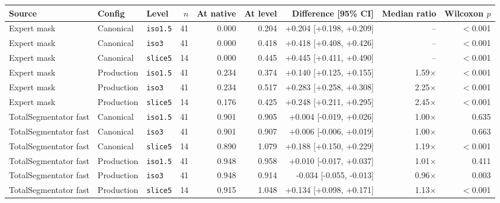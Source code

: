 \begin{tabular}{lllrrrrrr}
\toprule
Source & Config & Level & $n$ & At native & At level & Difference [95\% CI] & Median ratio & Wilcoxon $p$ \\
\midrule
Expert mask & Canonical & \texttt{iso1.5} & 41 & 0.000 & 0.204 & +0.204 [+0.198, +0.209] & -- & $<$0.001 \\
Expert mask & Canonical & \texttt{iso3} & 41 & 0.000 & 0.418 & +0.418 [+0.408, +0.426] & -- & $<$0.001 \\
Expert mask & Canonical & \texttt{slice5} & 14 & 0.000 & 0.445 & +0.445 [+0.411, +0.490] & -- & $<$0.001 \\
Expert mask & Production & \texttt{iso1.5} & 41 & 0.234 & 0.374 & +0.140 [+0.125, +0.155] & 1.59$\times$ & $<$0.001 \\
Expert mask & Production & \texttt{iso3} & 41 & 0.234 & 0.517 & +0.283 [+0.258, +0.308] & 2.25$\times$ & $<$0.001 \\
Expert mask & Production & \texttt{slice5} & 14 & 0.176 & 0.425 & +0.248 [+0.211, +0.295] & 2.45$\times$ & $<$0.001 \\
\midrule
TotalSegmentator fast & Canonical & \texttt{iso1.5} & 41 & 0.901 & 0.905 & +0.004 [-0.019, +0.026] & 1.00$\times$ & 0.635 \\
TotalSegmentator fast & Canonical & \texttt{iso3} & 41 & 0.901 & 0.907 & +0.006 [-0.006, +0.019] & 1.00$\times$ & 0.663 \\
TotalSegmentator fast & Canonical & \texttt{slice5} & 14 & 0.890 & 1.079 & +0.188 [+0.150, +0.229] & 1.19$\times$ & $<$0.001 \\
TotalSegmentator fast & Production & \texttt{iso1.5} & 41 & 0.948 & 0.958 & +0.010 [-0.017, +0.037] & 1.01$\times$ & 0.411 \\
TotalSegmentator fast & Production & \texttt{iso3} & 41 & 0.948 & 0.914 & -0.034 [-0.055, -0.013] & 0.96$\times$ & 0.003 \\
TotalSegmentator fast & Production & \texttt{slice5} & 14 & 0.915 & 1.048 & +0.134 [+0.098, +0.171] & 1.13$\times$ & $<$0.001 \\
\bottomrule
\end{tabular}
